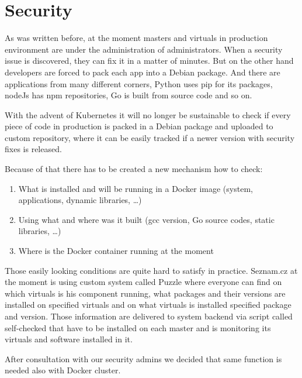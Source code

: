 \chapter{Security}

As was written before, at the moment masters and virtuals in production environment are under the administration of administrators. When a security issue is discovered, they can fix it in a matter of minutes. But on the other hand developers are forced to pack each app into a Debian package. And there are applications from many different corners, Python uses pip \cite{pip} for its packages, nodeJs \cite{nodejs} has npm \cite{npm} repositories, Go is built from source code and so on.

With the advent of Kubernetes it will no longer be sustainable to check if every piece of code in production is packed in a Debian package and uploaded to custom repository, where it can be easily tracked if a newer version with security fixes is released.

Because of that there has to be created a new mechanism how to check:
\begin{enumerate}
  \item What is installed and will be running in a Docker image (system, applications, dynamic libraries, \ldots)
  \item Using what and where was it built (gcc version, Go source codes, static libraries, \ldots)
  \item Where is the Docker container running at the moment
\end{enumerate}

Those easily looking conditions are quite hard to satisfy in practice. Seznam.cz at the moment is using custom system called Puzzle where everyone can find on which virtuals is his component running, what packages and their versions are installed on specified virtuals and on what virtuals is installed specified package and version. Those information are delivered to system backend via script called self-checked that have to be installed on each master and is monitoring its virtuals and software installed in it.

After consultation with our security admins we decided that same function is needed also with Docker cluster.

